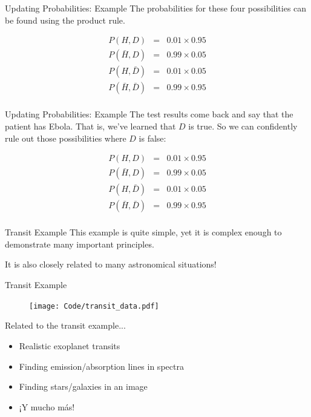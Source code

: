 \begin{frame}[t]{Updating Probabilities: Example}
The probabilities for these four possibilities can be found using the product
rule.

\begin{eqnarray*}
P(H, D) &=& 0.01 \times 0.95\\
P(\bar{H}, D) &=& 0.99 \times 0.05\\
P(H, \bar{D}) &=& 0.01 \times 0.05\\
P(\bar{H}, \bar{D}) &=& 0.99 \times 0.95\\
\end{eqnarray*}


\end{frame}

\begin{frame}[t]{Updating Probabilities: Example}
The test results come back and say that the patient has Ebola. That is, we've
learned that $D$ is true. So we can confidently rule out those possibilities
where $D$ is false:

\begin{eqnarray*}
P(H, D) &=& 0.01 \times 0.95\\
P(\bar{H}, D) &=& 0.99 \times 0.05\\
P(H, \bar{D}) &=& 0.01 \times 0.05\\
P(\bar{H}, \bar{D}) &=& 0.99 \times 0.95\\
\end{eqnarray*}


\end{frame}



\begin{frame}[t]{Transit Example}
This example is quite simple, yet it is complex enough to demonstrate many
important principles.
\vspace{1cm}

It is also closely related to many astronomical situations!
\end{frame}


\begin{frame}[t]{Transit Example}
\begin{figure}
\texttt{[image: Code/transit\_data.pdf]}
\end{figure}
\end{frame}



\begin{frame}[t]{Related to the transit example...}
\begin{itemize}
\item Realistic exoplanet transits
\item Finding emission/absorption lines in spectra
\item Finding stars/galaxies in an image
\item ¡Y mucho más!
\end{itemize}
\end{frame}


